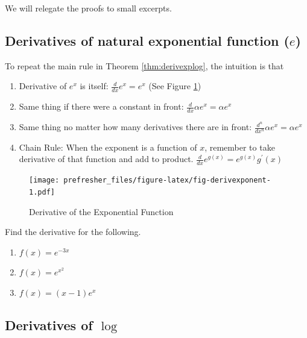 \documentclass[]{book}
\providecommand{\tightlist}{%
  \setlength{\itemsep}{0pt}\setlength{\parskip}{0pt}}
\theoremstyle{definition}
\theoremstyle{definition}
\theoremstyle{definition}
\theoremstyle{remark}
\let\BeginKnitrBlock\begin \let\EndKnitrBlock\end
\begin{document}
We will relegate the proofs to small excerpts.

\subsection*{\texorpdfstring{Derivatives of natural exponential function
(\(e\))}{Derivatives of natural exponential function (e)}}\label{derivatives-of-natural-exponential-function-e}

To repeat the main rule in Theorem \ref{thm:derivexplog}, the intuition
is that

\begin{enumerate}
\def\labelenumi{\arabic{enumi}.}
\tightlist
\item
  Derivative of \(e^x\) is itself: \(\frac{d}{dx}e^x = e^x\) (See Figure
  \ref{fig:fig-derivexponent})
\item
  Same thing if there were a constant in front:
  \(\frac{d}{dx}\alpha e^x = \alpha e^x\)
\item
  Same thing no matter how many derivatives there are in front:
  \(\frac{d^n}{dx^n} \alpha e^x = \alpha e^x\)
\item
  Chain Rule: When the exponent is a function of \(x\), remember to take
  derivative of that function and add to product.
  \(\frac{d}{dx}e^{g(x)}= e^{g(x)} g^\prime(x)\)
\end{enumerate}

\begin{figure}
\centering
\texttt{[image: prefresher\_files/figure-latex/fig-derivexponent-1.pdf]}
\caption{\label{fig:fig-derivexponent}Derivative of the Exponential
Function}
\end{figure}

\BeginKnitrBlock{example}[Derivative of exponents]
\protect\hypertarget{exm:exmderivexp}{}{\label{exm:exmderivexp}
{} }Find the derivative for the
following.

\begin{enumerate}
\def\labelenumi{\arabic{enumi}.}
\tightlist
\item
  \(f(x)=e^{-3x}\)
\item
  \(f(x)=e^{x^2}\)
\item
  \(f(x)=(x-1)e^x\)
\end{enumerate}
\EndKnitrBlock{example}

\subsection*{\texorpdfstring{Derivatives of
\(\log\)}{Derivatives of \textbackslash{}log}}\label{derivatives-of-log}
\end{document}
